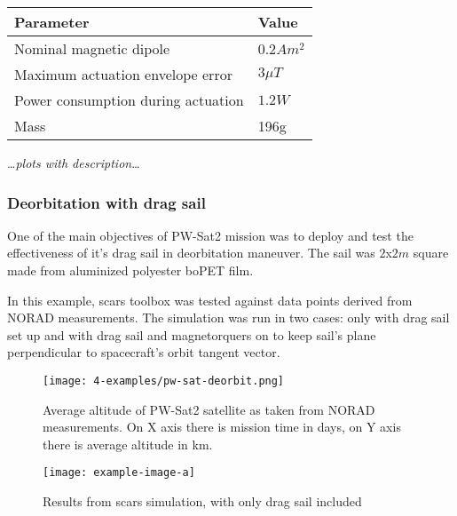                 \begin{center}    
                    \small
                    \begin{tabular}{l l}
                        \textbf{Parameter} & \textbf{Value} \\ \hline
                        Nominal magnetic dipole & $0.2 Am^2$ \\
                        Maximum actuation envelope error & $3\mu T$ \\
                        Power consumption during actuation & $1.2W$ \\
                        Mass & 196g
                    \end{tabular}
                \end{center}\label{table:pwsat2magne}

                \dots\textit{plots with description}\dots

        \subsubsection{Deorbitation with drag sail}
            One of the main objectives of PW-Sat2 mission was to deploy and test the effectiveness of it's drag sail in deorbitation maneuver. The sail was  $2$x$2m$ square made from aluminized polyester boPET film.\cite{pwsat2dt}
            
            In this example, \ac{scars} toolbox was tested against data points derived from NORAD measurements. The simulation was run in two cases: only with drag sail set up and with drag sail and magnetorquers on to keep sail's plane perpendicular to spacecraft's orbit tangent vector.
            
            \begin{figure}[H]
                \centering
                \texttt{[image: 4-examples/pw-sat-deorbit.png]}
                \caption{Average altitude of PW-Sat2 satellite as taken from NORAD measurements. On X axis there is mission time in days, on Y axis there is average altitude in km.}
                \label{fig:pw-sat-deorbit}
            \end{figure}
            
            \begin{figure}[H]
                \centering
                \texttt{[image: example-image-a]}
                \caption{Results from \ac{scars} simulation, with only drag sail included}
                \label{fig:scars-deorbit2}
            \end{figure}
            
